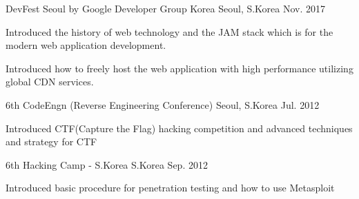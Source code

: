 

\begin{cventries}

	{DevFest Seoul by Google Developer Group Korea} %
	{Seoul, S.Korea} %
	{Nov. 2017} %
	{
		\begin{cvitems} %
			\item {Introduced the history of web technology and the JAM stack which is for the modern web application development.}
			\item {Introduced how to freely host the web application with high performance utilizing global CDN services.}
		\end{cvitems}
	}

	{6th CodeEngn (Reverse Engineering Conference)} %
	{Seoul, S.Korea} %
	{Jul. 2012} %
	{
		\begin{cvitems} %
			\item {Introduced CTF(Capture the Flag) hacking competition and advanced techniques and strategy for CTF}
		\end{cvitems}
	}

	{6th Hacking Camp - S.Korea} %
	{S.Korea} %
	{Sep. 2012} %
	{
		\begin{cvitems} %
			\item {Introduced basic procedure for penetration testing and how to use Metasploit}
		\end{cvitems}
	}

\end{cventries}
